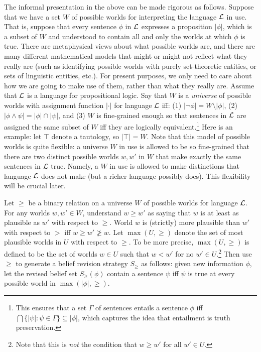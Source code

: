 The informal presentation in the above can be made rigorous as follows. Suppose that we have a set $W$ of possible worlds for interpreting the language $\cal L$ in use. That is, suppose that every sentence $\phi$ in ${\cal L}$ expresses a proposition $|\phi|$, which is a subset of $W$ and understood to contain all and only the worlds at which $\phi$ is true.  There are metaphysical views about what possible worlds are, and there are many different mathematical models that might or might not reflect what they really are (such as identifying possible worlds with purely set-theoretic entities, or sets of linguistic entities, etc.). For present purposes, we only need to care about how we are going to make use of them, rather than what they really are. Assume that ${\cal L}$ is a language for propositional logic. Say that $W$ is a {\em universe} of possible worlds with assignment function $|\cdot|$ for language ${\cal L}$ iff: (1) $|\neg\phi| = W \setminus |\phi|$, (2) $|\phi\wedge\psi| = |\phi|\cap|\psi|$, and (3) $W$ is fine-grained enough so that sentences in $\cal L$ are assigned the same subset of $W$ iff they are logically equivalent.\footnote
	{This ensures that a set $\Gamma$ of sentences entails a sentence $\phi$ iff $\bigcap \{ |\psi|: \psi \in \Gamma\} \subseteq |\phi|$, which captures the idea that entailment is truth preservation.} 
Here is an example: let $\top$ denote a tautology, so $|\top| = W$. Note that this model of possible worlds is quite flexible: a universe $W$ in use is allowed to be so fine-grained that there are two distinct possible worlds $w, w'$ in $W$ that make exactly the same sentences in $\cal L$ true. Namely, a $W$ in use is allowed to make distinctions that language $\cal L$ does not make (but a richer language possibly does). This flexibility will be crucial later. 


Let $\ge$ be a binary relation on a universe $W$ of possible worlds for language ${\cal L}$. For any worlds $w, w' \in W$, understand $w \ge w'$ as saying that $w$ is at least as plausible as $w'$ with respect to $\ge$. World $w$ is (strictly) more plausible than $w'$ with respect to $>$ iff $w \ge w' \not\geq w$. Let $\max(U, \ge)$ denote the set of most plausible worlds in $U$ with respect to $\ge$. To be more precise, $\max(U, \ge)$ is defined to be the set of worlds $w \in U$ such that $w < w'$ for no $w' \in U$.\footnote
	{
	Note that this is {\em not} the condition that $w \geq w'$ for all $w' \in U$.
	} 
Then use $\ge$ to generate a belief revision strategy $S_{\ge}$ as follows: given new information $\phi$, let the revised belief set $S_{\ge}(\phi)$ contain a sentence $\psi$ iff $\psi$ is true at every possible world in $\max(|\phi|, \ge)$. \op

